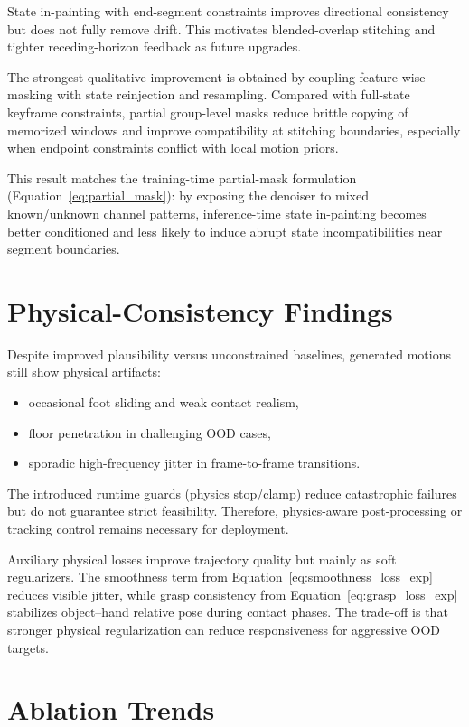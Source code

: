 State in-painting with end-segment constraints improves directional consistency but does not fully remove drift. This motivates blended-overlap stitching and tighter receding-horizon feedback as future upgrades.

The strongest qualitative improvement is obtained by coupling feature-wise masking with state reinjection and resampling. Compared with full-state keyframe constraints, partial group-level masks reduce brittle copying of memorized windows and improve compatibility at stitching boundaries, especially when endpoint constraints conflict with local motion priors.

This result matches the training-time partial-mask formulation (Equation~\ref{eq:partial_mask}): by exposing the denoiser to mixed known/unknown channel patterns, inference-time state in-painting becomes better conditioned and less likely to induce abrupt state incompatibilities near segment boundaries.

\section{Physical-Consistency Findings}

Despite improved plausibility versus unconstrained baselines, generated motions still show physical artifacts:
\begin{itemize}
	\item occasional foot sliding and weak contact realism,
	\item floor penetration in challenging OOD cases,
	\item sporadic high-frequency jitter in frame-to-frame transitions.
\end{itemize}

The introduced runtime guards (physics stop/clamp) reduce catastrophic failures but do not guarantee strict feasibility. Therefore, physics-aware post-processing or tracking control remains necessary for deployment.

Auxiliary physical losses improve trajectory quality but mainly as soft regularizers. The smoothness term from Equation~\ref{eq:smoothness_loss_exp} reduces visible jitter, while grasp consistency from Equation~\ref{eq:grasp_loss_exp} stabilizes object--hand relative pose during contact phases. The trade-off is that stronger physical regularization can reduce responsiveness for aggressive OOD targets.

\section{Ablation Trends}
\label{sec:results_ablations}

